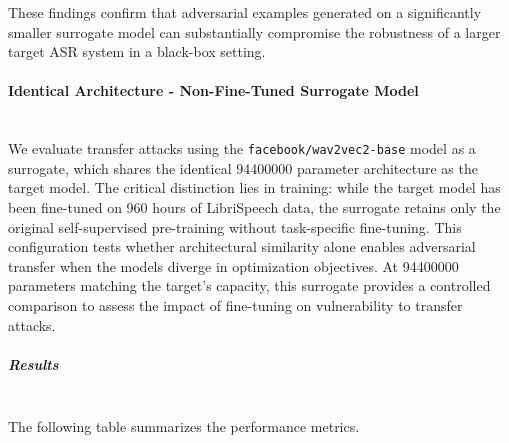 \documentclass[../main.tex]{subfiles}
\begin{document}
These findings confirm that adversarial examples generated on a significantly smaller surrogate model can substantially compromise the robustness of a larger target ASR system in a black-box setting.

\paragraph{Identical Architecture - Non-Fine-Tuned Surrogate Model}\leavevmode\\
We evaluate transfer attacks using the \texttt{facebook/wav2vec2-base} model as a surrogate, which shares the identical \num{94400000} parameter architecture as the target model. The critical distinction lies in training: while the target model has been fine-tuned on 960 hours of LibriSpeech data, the surrogate retains only the original self-supervised pre-training without task-specific fine-tuning. This configuration tests whether architectural similarity alone enables adversarial transfer when the models diverge in optimization objectives. At \num{94400000} parameters matching the target’s capacity, this surrogate provides a controlled comparison to assess the impact of fine-tuning on vulnerability to transfer attacks.

\subparagraph{Results}\leavevmode\\
The following table summarizes the performance metrics.

\begin{table}[h]
\centering
\small
\caption{Performance Metrics for Transfer Attacks with Identical Architecture Surrogate}
\label{tab:transfer_asr2}
\end{table}
\end{document}
